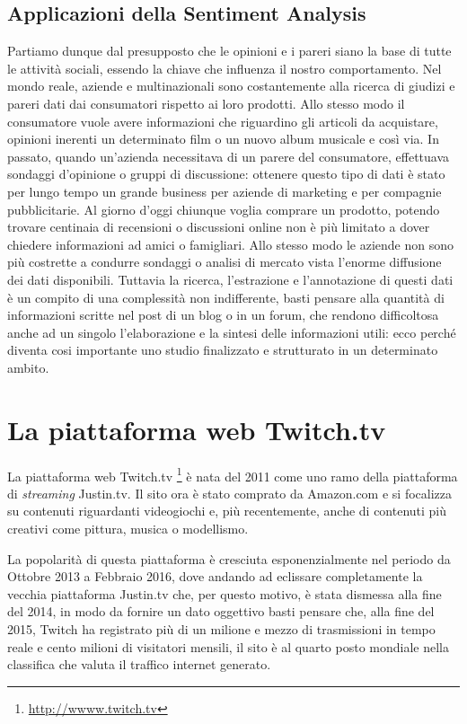 \documentclass[a4paper,12pt,openright,twoside]{report}
\theoremstyle{definition}
\begin{document}
\subsection{Applicazioni della Sentiment Analysis}
Partiamo dunque dal presupposto che le opinioni e i pareri siano la base di tutte le attività sociali,
 essendo la chiave che influenza il nostro comportamento. Nel mondo reale, aziende e multinazionali 
 sono costantemente alla ricerca di giudizi e pareri dati dai consumatori  rispetto ai loro prodotti. 
 Allo stesso modo il consumatore vuole avere informazioni che riguardino gli articoli da acquistare, 
 opinioni inerenti un determinato film o un nuovo album musicale e così via. In passato, quando un’azienda 
 necessitava di un parere del consumatore, effettuava sondaggi d’opinione o gruppi di discussione: 
 ottenere questo tipo di dati è stato per lungo tempo un grande business per aziende di marketing e 
 per compagnie pubblicitarie.
Al giorno d’oggi chiunque voglia comprare un prodotto, potendo trovare centinaia di recensioni o 
discussioni online non è più limitato a dover chiedere informazioni ad amici o famigliari. 
Allo stesso modo le aziende non sono più costrette a condurre sondaggi o analisi di mercato vista 
l’enorme diffusione dei dati disponibili. Tuttavia la ricerca, l’estrazione e l’annotazione di questi 
dati è un compito di una complessità non indifferente, basti pensare alla quantità di informazioni 
scritte nel post di un blog o in un forum, che rendono difficoltosa anche ad un singolo l'elaborazione 
e la sintesi delle informazioni utili: ecco perché diventa cosi importante uno studio finalizzato e 
strutturato in un determinato ambito.

\section{La piattaforma web Twitch.tv}

La piattaforma web Twitch.tv \footnote{\url{http://wwww.twitch.tv}} è nata del 2011 come uno ramo
della piattaforma di \emph{streaming} Justin.tv. Il sito ora è stato comprato da Amazon.com e si
focalizza su contenuti riguardanti videogiochi e, più recentemente, anche di contenuti più creativi
come pittura, musica o modellismo.

La popolarità di questa piattaforma è cresciuta esponenzialmente nel periodo da Ottobre 2013 a Febbraio 2016, dove
andando ad eclissare completamente la vecchia piattaforma Justin.tv che, per questo motivo, 
è stata dismessa alla fine del 2014, in modo da fornire un dato oggettivo basti pensare
che, alla fine del 2015, Twitch ha registrato più di un milione e mezzo di trasmissioni
in tempo reale e cento milioni di visitatori mensili, il sito è al quarto posto mondiale nella classifica
che valuta il traffico internet generato.
\end{document}
